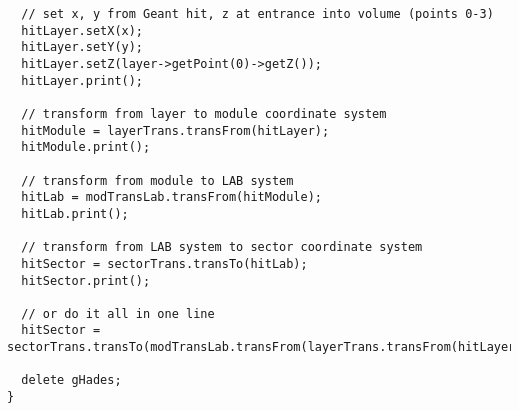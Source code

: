 \begin{lstlisting}
  // set x, y from Geant hit, z at entrance into volume (points 0-3)
  hitLayer.setX(x);
  hitLayer.setY(y);
  hitLayer.setZ(layer->getPoint(0)->getZ());
  hitLayer.print();

  // transform from layer to module coordinate system
  hitModule = layerTrans.transFrom(hitLayer); 
  hitModule.print();

  // transform from module to LAB system
  hitLab = modTransLab.transFrom(hitModule);
  hitLab.print();

  // transform from LAB system to sector coordinate system
  hitSector = sectorTrans.transTo(hitLab); 
  hitSector.print();

  // or do it all in one line
  hitSector = sectorTrans.transTo(modTransLab.transFrom(layerTrans.transFrom(hitLayer)));

  delete gHades;
}
\end{lstlisting}

